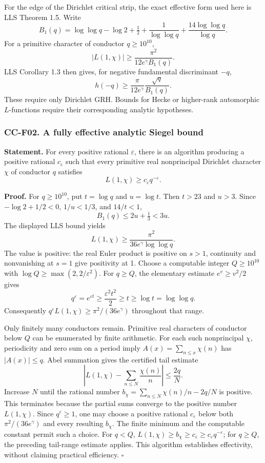 \documentclass[11pt,a4paper]{article}
\theoremstyle{definition}\newtheorem{definition}[theorem]{Definition}
\theoremstyle{remark}\newtheorem{remark}[theorem]{Remark}
\begin{document}
For the edge of the Dirichlet critical strip, the exact effective form
used here is LLS Theorem 1.5. Write \[
 B_1(q)=\log\log q-\log2+\tfrac12+\frac1{\log\log q}
       +\frac{14\log\log q}{\log q}.
\] For a primitive character of conductor \(q\ge10^{10}\), \[
 |L(1,\chi)|\ge\frac{\pi^2}{12e^\gamma B_1(q)}.
\] LLS Corollary 1.3 then gives, for negative fundamental discriminant
\(-q\), \[
 h(-q)\ge\frac{\pi}{12e^\gamma}\frac{\sqrt q}{B_1(q)}.
\] These require only Dirichlet GRH. Bounds for Hecke or higher-rank
automorphic \(L\)-functions require their corresponding analytic
hypotheses.

\subsubsection{CC-F02. A fully effective analytic Siegel
bound}\label{cc-f02.-a-fully-effective-analytic-siegel-bound}

\textbf{Statement.} For every positive rational \(\varepsilon\), there
is an algorithm producing a positive rational \(c_\varepsilon\) such
that every primitive real nonprincipal Dirichlet character \(\chi\) of
conductor \(q\) satisfies \[
 L(1,\chi)\ge c_\varepsilon q^{-\varepsilon}.
\]

\textbf{Proof.} For \(q\ge10^{10}\), put \(t=\log q\) and \(u=\log t\).
Then \(t>23\) and \(u>3\). Since \(-\log2+1/2<0\), \(1/u<1/3\), and
\(14/t<1\), \[
 B_1(q)\le2u+\tfrac13<3u.
\] The displayed LLS bound yields \[
 L(1,\chi)\ge \frac{\pi^2}{36e^\gamma\log\log q}.
\] The value is positive: the real Euler product is positive on \(s>1\),
continuity and nonvanishing at \(s=1\) give positivity at 1. Choose a
computable integer \(Q\ge10^{10}\) with
\(\log Q\ge\max(2,2/\varepsilon^2)\). For \(q\ge Q\), the elementary
estimate \(e^v\ge v^2/2\) gives \[
 q^\varepsilon=e^{\varepsilon t}
 \ge\frac{\varepsilon^2t^2}{2}\ge t\ge\log t=\log\log q.
\] Consequently \(q^\varepsilon L(1,\chi)\ge\pi^2/(36e^\gamma)\)
throughout that range.

Only finitely many conductors remain. Primitive real characters of
conductor below \(Q\) can be enumerated by finite arithmetic. For each
such nonprincipal \(\chi\), periodicity and zero sum on a period imply
\(A(x)=\sum_{n\le x}\chi(n)\) has \(|A(x)|\le q\). Abel summation gives
the certified tail estimate \[
 \left|L(1,\chi)-\sum_{n\le N}\frac{\chi(n)}n\right|
 \le \frac{2q}{N}.
\] Increase \(N\) until the rational number
\(b_\chi=\sum_{n\le N}\chi(n)/n-2q/N\) is positive. This terminates
because the partial sums converge to the positive number \(L(1,\chi)\).
Since \(q^\varepsilon\ge1\), one may choose a positive rational
\(c_\varepsilon\) below both \(\pi^2/(36e^\gamma)\) and every resulting
\(b_\chi\). The finite minimum and the computable constant permit such a
choice. For \(q<Q\),
\(L(1,\chi)\ge b_\chi\ge c_\varepsilon\ge c_\varepsilon q^{-\varepsilon}\);
for \(q\ge Q\), the preceding tail-range estimate applies. This
algorithm establishes effectivity, without claiming practical
efficiency. \(\square\)
\end{document}
